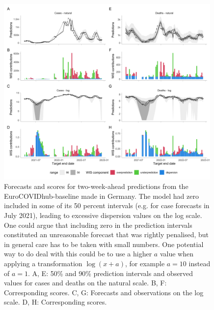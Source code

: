 \documentclass{article}
\begin{document}
\begin{figure}[h!]
    \centering
    \includegraphics[width=0.99\textwidth]{output/figures/HUB-model-comparison-baseline.png}
    \caption{
    Forecasts and scores for two-week-ahead predictions from the EuroCOVIDhub-baseline made in Germany. The model had zero included in some of its 50 percent intervals (e.g. for case forecasts in July 2021), leading to excessive dispersion values on the log scale. One could argue that including zero in the prediction intervals constituted an unreasonable forecast that was rightly penalised, but in general care has to be taken with small numbers. One potential way to do deal with this could be to use a higher $a$ value when applying a transformation $\log(x + a)$, for example $a = 10$ instead of $a = 1$. A, E: 50\% and 90\% prediction intervals and observed values for cases and deaths on the natural scale. B, F: Corresponding scores. C, G: Forecasts and observations on the log scale. D, H: Corresponding scores. 
    }
    \label{fig:HUB-model-comparison-baseline}
\end{figure}
\end{document}
